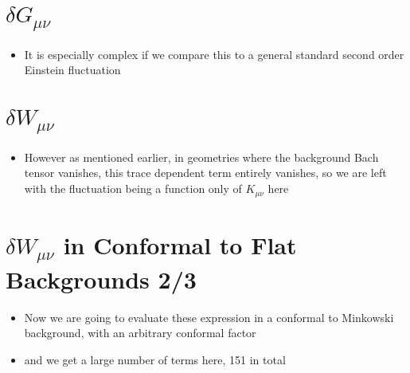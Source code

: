 \documentclass[10pt,letterpaper]{article}
\numberwithin{equation}{section}
\begin{document}
\section{$\delta G_{\mu\nu}$}
\begin{itemize}
	\item It is especially complex if we compare this to a general standard second order Einstein fluctuation
\end{itemize}



\section{$\delta W_{\mu\nu}$}
\begin{itemize}
	\item However as mentioned earlier, in geometries where the background Bach tensor vanishes, this trace dependent term entirely vanishes, so we are left with the fluctuation being a function only of $K_{\mu\nu}$ here
\end{itemize}


\section{$\delta W_{\mu\nu}$ in Conformal to Flat Backgrounds 2/3}
\begin{itemize}
	\item Now we are going to evaluate these expression in a conformal to Minkowski background, with an arbitrary conformal factor
	\item and we get a large number of terms here, 151 in total
\end{itemize}

\end{document}
